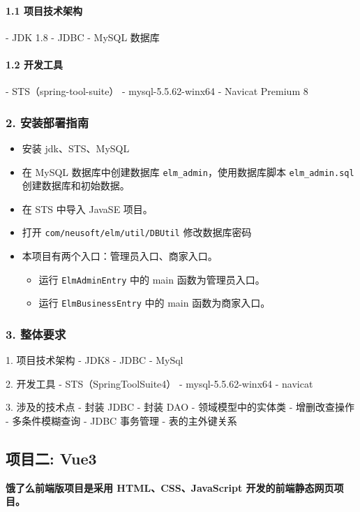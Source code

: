\paragraph*{1.1 项目技术架构}
- JDK 1.8
- JDBC
- MySQL 数据库

\paragraph*{1.2 开发工具}
- STS（spring-tool-suite）
- mysql-5.5.62-winx64
- Navicat Premium 8

\subsubsection*{2. 安装部署指南}
\begin{itemize}
  \item 安装 jdk、STS、MySQL
  \item 在 MySQL 数据库中创建数据库 \texttt{elm\_admin}，使用数据库脚本 \texttt{elm\_admin.sql} 创建数据库和初始数据。  \item 在 STS 中导入 JavaSE 项目。
  \item 打开 \texttt{com/neusoft/elm/util/DBUtil} 修改数据库密码
  \item 本项目有两个入口：管理员入口、商家入口。
      \begin{itemize}
          \item 运行 \texttt{ElmAdminEntry} 中的 main 函数为管理员入口。
          \item 运行 \texttt{ElmBusinessEntry} 中的 main 函数为商家入口。
      \end{itemize}
\end{itemize}
\subsubsection*{3. 整体要求}
1. 项目技术架构
   - JDK8
   - JDBC
   - MySql
   
2. 开发工具
   - STS（SpringToolSuite4）
   - mysql-5.5.62-winx64
   - navicat
   
3. 涉及的技术点
   - 封装 JDBC
   - 封装 DAO
   - 领域模型中的实体类
   - 增删改查操作
   - 多条件模糊查询
   - JDBC 事务管理
   - 表的主外键关系

   
\subsection*{项目二: Vue3}
\textbf{饿了么前端版项目是采用 HTML、CSS、JavaScript 开发的前端静态网页项目。}

